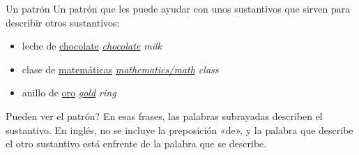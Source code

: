 \begin{conf}{Un patr\'on}
	Un patr\'on que les puede ayudar con unos sustantivos que sirven para describir otros sustantivos:
	\begin{itemize}
		\item leche de \underline{chocolate} \arr \emph{\underline{chocolate} milk}
		\item clase de \underline{matemáticas} \arr \emph{\underline{mathematics/math} class}
		\item anillo de \underline{oro} \arr \emph{\underline{gold} ring}
	\end{itemize}

	\textquestiondown Pueden ver el patr\'on?
	En esas frases, las palabras subrayadas describen el sustantivo.
	En ingl\'es, no se incluye la preposici\'on «de», y la palabra que describe el otro sustantivo está enfrente de
	la palabra que se describe.
\end{conf}


